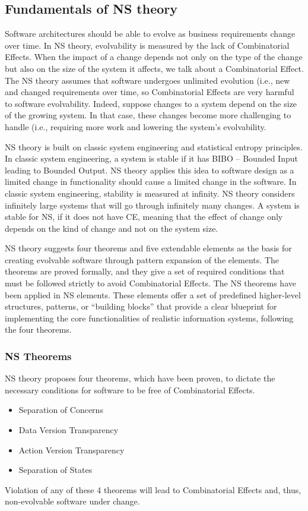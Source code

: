 \subsection{Fundamentals of NS theory}\label{NS Fundamentals} Software architectures
should be able to evolve as business requirements change over time. In NS theory,
evolvability is measured by the lack of Combinatorial Effects. When the impact of a change
depends not only on the type of the change but also on the size of the system it affects,
we talk about a Combinatorial Effect. The NS theory assumes that software undergoes
unlimited evolution (i.e., new and changed requirements over time, so Combinatorial
Effects are very harmful to software evolvability. Indeed, suppose changes to a system
depend on the size of the growing system. In that case, these changes become more
challenging to handle (i.e., requiring more work and lowering the system's evolvability. 

NS theory is built on classic system engineering and statistical entropy principles. In
classic system engineering, a system is stable if it has BIBO – Bounded Input leading to
Bounded Output. NS theory applies this idea to software design as a limited change in
functionality should cause a limited change in the software. In classic system
engineering, stability is measured at infinity. NS theory considers infinitely large
systems that will go through infinitely many changes. A system is stable for NS, if it
does not have CE, meaning that the effect of change only depends on the kind of change and
not on the system size.

NS theory suggests four theorems and five extendable elements as the basis for creating
evolvable software through pattern expansion of the elements. The theorems are proved
formally, and they give a set of required conditions that must be followed strictly to
avoid Combinatorial Effects. The NS theorems have been applied in NS elements. These
elements offer a set of predefined higher-level structures, patterns, or “building blocks”
that provide a clear blueprint for implementing the core functionalities of realistic
information systems, following the four theorems. \\
%
%
\subsubsection{NS Theorems}\label{NS Theorems}
NS theory proposes four theorems, which have been proven, to dictate the necessary conditions for software to be free of Combinatorial Effects.
\begin{itemize}
    \item Separation of Concerns 
    \item Data Version Transparency
    \item Action Version Transparency 
    \item Separation of States
\end{itemize}
Violation of any of these 4 theorems will lead to Combinatorial Effects and, thus, non-evolvable software under change.
\\
%
%

